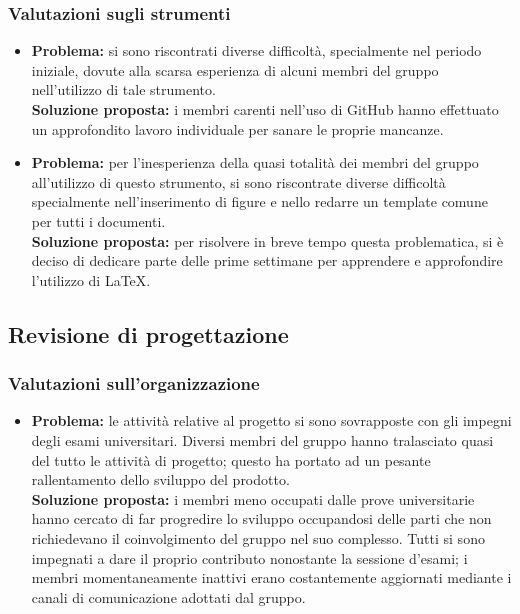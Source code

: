 \subsubsection{Valutazioni sugli strumenti}
\begin{itemize}
	\item \textbf{Problema:} si sono riscontrati diverse difficoltà, specialmente nel periodo iniziale, dovute alla scarsa esperienza di alcuni membri del gruppo nell'utilizzo di tale strumento.\\
	\textbf{Soluzione proposta:} i membri carenti nell'uso di GitHub hanno effettuato un approfondito lavoro individuale per sanare le proprie mancanze.
\end{itemize}
\myparagraph{\LaTeX}
\begin{itemize}
	\item \textbf{Problema:} per l'inesperienza della quasi totalità dei membri del gruppo all'utilizzo di questo strumento, si sono riscontrate diverse difficoltà specialmente nell'inserimento di figure e nello redarre un template comune per tutti i documenti.\\
	\textbf{Soluzione proposta:} per risolvere in breve tempo questa problematica, si è deciso di dedicare parte delle prime settimane per apprendere e approfondire l'utilizzo di \LaTeX.
\end{itemize}
\subsection{Revisione di progettazione} \label{MiglioramentoRP}
\subsubsection{Valutazioni sull'organizzazione}
\begin{itemize}
	\item \textbf{Problema:} le attività relative al progetto si sono sovrapposte con gli impegni degli esami universitari. Diversi membri del gruppo hanno tralasciato quasi del tutto le attività di progetto; questo ha portato ad un pesante rallentamento dello sviluppo del prodotto.\\
	\textbf{Soluzione proposta:} i membri meno occupati dalle prove universitarie hanno cercato di far progredire lo sviluppo occupandosi delle parti che non richiedevano il coinvolgimento del gruppo nel suo complesso. Tutti si sono impegnati a dare il proprio contributo nonostante la sessione d'esami; i membri momentaneamente inattivi erano costantemente aggiornati mediante i canali di comunicazione adottati dal gruppo.
\end{itemize}
